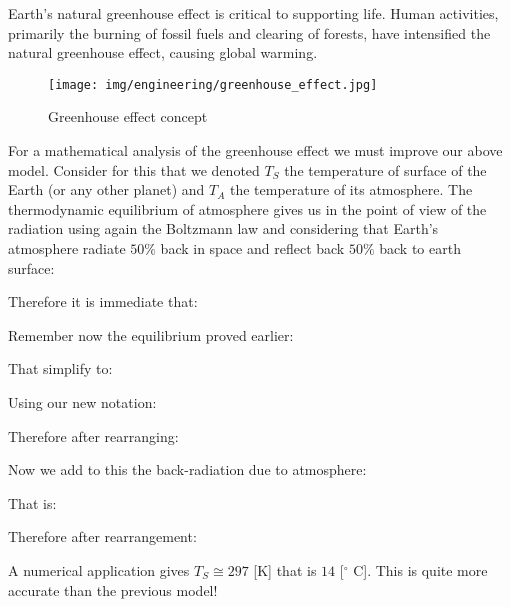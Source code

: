 	Earth's natural greenhouse effect is critical to supporting life. Human activities, primarily the burning of fossil fuels and clearing of forests, have intensified the natural greenhouse effect, causing global warming.
	\begin{figure}[H]
		\begin{center}
			\texttt{[image: img/engineering/greenhouse\_effect.jpg]}
		\end{center}	
		\caption{Greenhouse effect concept}
	\end{figure}
	
	For a mathematical analysis of the greenhouse effect we must improve our above model. Consider for this that we denoted $T_S$ the temperature of surface of the Earth (or any other planet) and $T_A$ the temperature of its atmosphere.	The thermodynamic equilibrium of atmosphere gives us in the point of view of the radiation using again the Boltzmann law and considering that Earth's atmosphere radiate $50\%$ back in space and reflect back $50\%$ back to earth surface:
	
	Therefore it is immediate that:
	
	Remember now the equilibrium proved earlier:
	
	That simplify to:
	
	Using our new notation:
	
	Therefore after rearranging:
	
	Now we add to this the back-radiation due to atmosphere:
	
	That is:
	
	Therefore after rearrangement:
	
	A numerical application gives $T_S\cong 297$ [K] that is $14$ [$^\circ$ C]. This is quite more accurate than the previous model!

